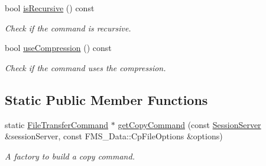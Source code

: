 \begin{DoxyCompactItemize}
bool \hyperlink{classFileTransferCommand_ae2393d677228bf89216d163604d20130}{isRecursive} () const 
\begin{DoxyCompactList}\small\item\em Check if the command is recursive. \item\end{DoxyCompactList}\item 
bool \hyperlink{classFileTransferCommand_a35dd0e3c154f243b00e3833881d5f8ad}{useCompression} () const 
\begin{DoxyCompactList}\small\item\em Check if the command uses the compression. \item\end{DoxyCompactList}\end{DoxyCompactItemize}
\subsection*{Static Public Member Functions}
\begin{DoxyCompactItemize}
\item 
static \hyperlink{classFileTransferCommand}{FileTransferCommand} $\ast$ \hyperlink{classFileTransferCommand_aeb0d1bd0b544169d037f54946d7a0bb3}{getCopyCommand} (const \hyperlink{classSessionServer}{SessionServer} \&sessionServer, const FMS\_\-Data::CpFileOptions \&options)
\begin{DoxyCompactList}\small\item\em A factory to build a copy command. \item\end{DoxyCompactList}\end{DoxyCompactItemize}
